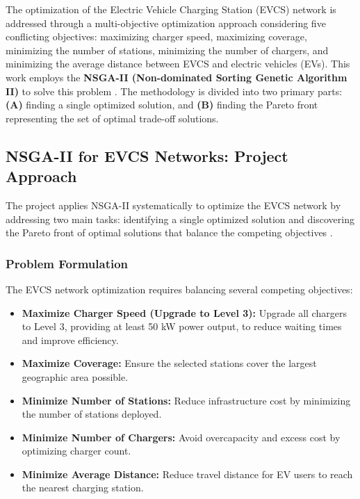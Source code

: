 The optimization of the Electric Vehicle Charging Station (EVCS) network is addressed through a multi-objective optimization approach considering five conflicting objectives: maximizing charger speed, maximizing coverage, minimizing the number of stations, minimizing the number of chargers, and minimizing the average distance between EVCS and electric vehicles (EVs). This work employs the \textbf{NSGA-II (Non-dominated Sorting Genetic Algorithm II)} to solve this problem \cite{A_Fast_and_Elitist_Multi_objective_Genetic_Algorithm_NSGA_II}. The methodology is divided into two primary parts:  
\textbf{(A)} finding a single optimized solution, and  
\textbf{(B)} finding the Pareto front representing the set of optimal trade-off solutions.

\subsection*{NSGA-II for EVCS Networks: Project Approach}

The project applies NSGA-II systematically to optimize the EVCS network by addressing two main tasks: identifying a single optimized solution and discovering the Pareto front of optimal solutions that balance the competing objectives \cite{Introduction_to_evolutionary_computing}.

\subsubsection*{Problem Formulation}

The EVCS network optimization requires balancing several competing objectives:

\begin{itemize}
    \item \textbf{Maximize Charger Speed (Upgrade to Level 3):} Upgrade all chargers to Level 3, providing at least 50 kW power output, to reduce waiting times and improve efficiency.
    \item \textbf{Maximize Coverage:} Ensure the selected stations cover the largest geographic area possible.
    \item \textbf{Minimize Number of Stations:} Reduce infrastructure cost by minimizing the number of stations deployed.
    \item \textbf{Minimize Number of Chargers:} Avoid overcapacity and excess cost by optimizing charger count.
    \item \textbf{Minimize Average Distance:} Reduce travel distance for EV users to reach the nearest charging station.
\end{itemize}

